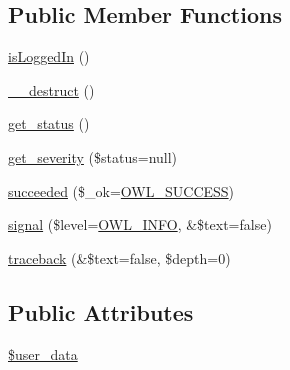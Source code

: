 \subsection*{Public Member Functions}
\begin{DoxyCompactItemize}
\item 
\hyperlink{classUserHandler_a4539c12ed2ce12a9147d61496854d5ab}{isLoggedIn} ()
\item 
\hyperlink{classUserHandler_a3e1f6381ed79caf6e1a255fb0a9cc386}{\_\-\_\-destruct} ()
\item 
\hyperlink{class__OWL_a99ec771fa2c5c279f80152cc09e489a8}{get\_\-status} ()
\item 
\hyperlink{class__OWL_adf9509ef96858be7bdd9414c5ef129aa}{get\_\-severity} (\$status=null)
\item 
\hyperlink{class__OWL_ae76c46aff1ad253106332670fc59c777}{succeeded} (\$\_\-ok=\hyperlink{owl_8severitycodes_8php_a96223f06ba27bf5cbefa6e9d702897c2}{OWL\_\-SUCCESS})
\item 
\hyperlink{class__OWL_a51ba4a16409acf2a2f61f286939091a5}{signal} (\$level=\hyperlink{owl_8severitycodes_8php_a139328861128689f2f4def6a399d9057}{OWL\_\-INFO}, \&\$text=false)
\item 
\hyperlink{class__OWL_aa29547995d6741b7d2b90c1d4ea99a13}{traceback} (\&\$text=false, \$depth=0)
\end{DoxyCompactItemize}
\subsection*{Public Attributes}
\begin{DoxyCompactItemize}
\item 
\hyperlink{classUserHandler_ae7a2d59eee65560ac96b860e828bb445}{\$user\_\-data}
\end{DoxyCompactItemize}
